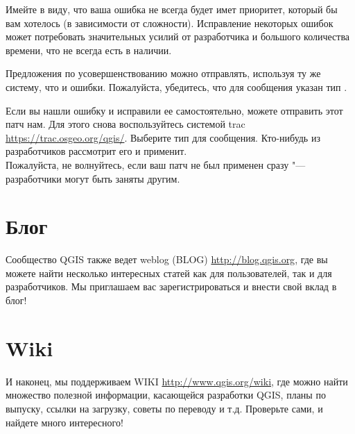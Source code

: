 Имейте в виду, что ваша ошибка не всегда будет имет приоритет, который
бы вам хотелось (в зависимости от сложности). Исправление некоторых
ошибок может потребовать значительных усилий от разработчика и большого
количества времени, что не всегда есть в наличии.

Предложения по усовершенствованию можно отправлять, используя ту же
систему, что и ошибки. Пожалуйста, убедитесь, что для сообщения указан
тип .

Если вы нашли ошибку и исправили ее самостоятельно, можете отправить
этот патч нам. Для этого снова воспользуйтесь системой trac
\url{https://trac.osgeo.org/qgis/}. Выберите тип  для
сообщения. Кто-нибудь из разработчиков рассмотрит его и применит. \\
Пожалуйста, не волнуйтесь, если ваш патч не был применен сразу "---
разработчики могут быть заняты другим.


\section{Блог}
Сообщество QGIS также ведет weblog (BLOG) \url{http://blog.qgis.org},
где вы можете найти несколько интересных статей как для пользователей,
так и для разработчиков. Мы приглашаем вас зарегистрироваться и внести
свой вклад в блог!

\section{Wiki}
И наконец, мы поддерживаем WIKI \url{http://www.qgis.org/wiki}, где
можно найти множество полезной информации, касающейся разработки QGIS,
планы по выпуску, ссылки на загрузку, советы по переводу и т.д.
Проверьте сами, и найдете много интересного!
